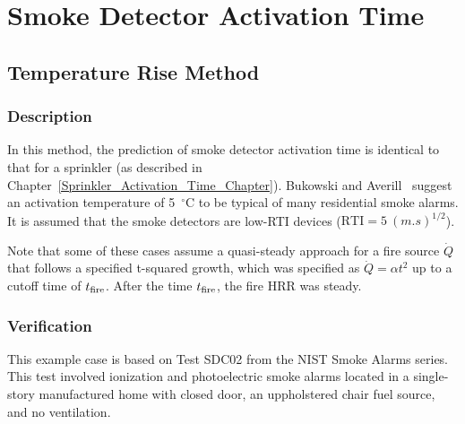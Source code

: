 
\chapter{Smoke Detector Activation Time}
\label{Smoke_Detector_Activation_Time_Chapter}

\section{Temperature Rise Method}

\subsection*{Description}

In this method, the prediction of smoke detector activation time is identical to that for a sprinkler (as described in Chapter~\ref{Sprinkler_Activation_Time_Chapter}). Bukowski and Averill~\cite{Bukowski:2} suggest an activation temperature of 5~$^\circ$C to be typical of many residential smoke alarms. It is assumed that the smoke detectors are low-RTI devices ($\textrm{RTI}=5~\si{(m.s)^{1/2}}$).

Note that some of these cases assume a quasi-steady approach for a fire source $\dot Q$ that follows a specified t-squared growth, which was specified as $\dot Q = \alpha t^2$ up to a cutoff time of $t\sb{fire}$. After the time $t\sb{fire}$, the fire HRR was steady.


\clearpage


\subsection*{Verification}

This example case is based on Test SDC02 from the NIST Smoke Alarms series. This test involved ionization and photoelectric smoke alarms located in a single-story manufactured home with closed door, an uppholstered chair fuel source, and no ventilation.

